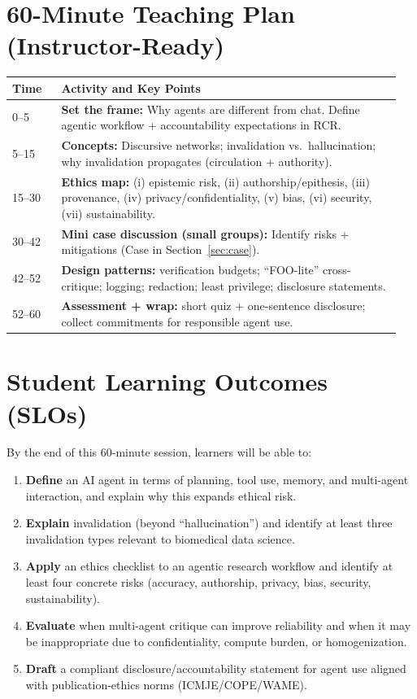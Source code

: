 \documentclass[11pt]{article}
\begin{document}
\section{60-Minute Teaching Plan (Instructor-Ready)}
\begin{center}
\begin{tabular}{@{}p{0.12\linewidth}p{0.83\linewidth}@{}}
\toprule
\textbf{Time} & \textbf{Activity and Key Points} \\
\midrule
0--5 & \textbf{Set the frame:} Why agents are different from chat. Define agentic workflow + accountability expectations in RCR. \\
5--15 & \textbf{Concepts:} Discursive networks; invalidation vs.\ hallucination; why invalidation propagates (circulation + authority). \\
15--30 & \textbf{Ethics map:} (i) epistemic risk, (ii) authorship/epithesis, (iii) provenance, (iv) privacy/confidentiality, (v) bias, (vi) security, (vii) sustainability. \\
30--42 & \textbf{Mini case discussion (small groups):} Identify risks + mitigations (Case in Section~\ref{sec:case}). \\
42--52 & \textbf{Design patterns:} verification budgets; ``FOO-lite'' cross-critique; logging; redaction; least privilege; disclosure statements. \\
52--60 & \textbf{Assessment + wrap:} short quiz + one-sentence disclosure; collect commitments for responsible agent use. \\
\bottomrule
\end{tabular}
\end{center}

\section{Student Learning Outcomes (SLOs)}
By the end of this 60-minute session, learners will be able to:
\begin{enumerate}[label=\textbf{SLO\arabic*.}, leftmargin=*]
\item \textbf{Define} an AI agent in terms of planning, tool use, memory, and multi-agent interaction, and explain why this expands ethical risk.
\item \textbf{Explain} invalidation (beyond ``hallucination'') and identify at least three invalidation types relevant to biomedical data science.
\item \textbf{Apply} an ethics checklist to an agentic research workflow and identify at least four concrete risks (accuracy, authorship, privacy, bias, security, sustainability).
\item \textbf{Evaluate} when multi-agent critique can improve reliability and when it may be inappropriate due to confidentiality, compute burden, or homogenization.
\item \textbf{Draft} a compliant disclosure/accountability statement for agent use aligned with publication-ethics norms (ICMJE/COPE/WAME).
\end{enumerate}
\end{document}
